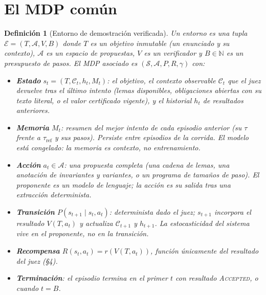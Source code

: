 \documentclass[11pt,a4paper]{article}
\newtheorem{definition}{Definición}
\begin{document}
\section{El MDP común}

\begin{definition}[Entorno de demostración verificada]
Un entorno es una tupla $\mathcal{E} = (T, \mathcal{A}, V, B)$ donde $T$ es un \emph{objetivo} inmutable (un enunciado y su contexto), $\mathcal{A}$ es un espacio de \emph{propuestas}, $V$ es un \emph{verificador} y $B \in \mathbb{N}$ es un presupuesto de pasos. El MDP asociado es $(\mathcal{S}, \mathcal{A}, P, R, \gamma)$ con:
\begin{itemize}
  \item \textbf{Estado} $s_t = (T, \mathcal{C}_t, h_t, M_t)$: el objetivo, el \emph{contexto observable} $\mathcal{C}_t$ que el juez devuelve tras el último intento (lemas disponibles, obligaciones abiertas con su texto literal, o el valor certificado vigente), y el historial $h_t$ de resultados anteriores.
  \item \textbf{Memoria} $M_t$: resumen del mejor intento de cada episodio anterior (su $\tau$ frente a $\tau_{\mathrm{ref}}$ y sus pasos). Persiste entre episodios de la corrida. El modelo está congelado: la memoria es contexto, no entrenamiento.
  \item \textbf{Acción} $a_t \in \mathcal{A}$: una propuesta completa (una cadena de lemas, una anotación de invariantes y variantes, o un programa de tamaños de paso). El proponente es un modelo de lenguaje; la acción es su salida tras una extracción determinista.
  \item \textbf{Transición} $P(s_{t+1} \mid s_t, a_t)$: determinista dado el juez; $s_{t+1}$ incorpora el resultado $V(T, a_t)$ y actualiza $\mathcal{C}_{t+1}$ y $h_{t+1}$. La estocasticidad del sistema vive en el proponente, no en la transición.
  \item \textbf{Recompensa} $R(s_t, a_t) = r(V(T, a_t))$, función únicamente del resultado del juez (§4).
  \item \textbf{Terminación}: el episodio termina en el primer $t$ con resultado \textsc{Accepted}, o cuando $t = B$.
\end{itemize}
\end{definition}
\end{document}

